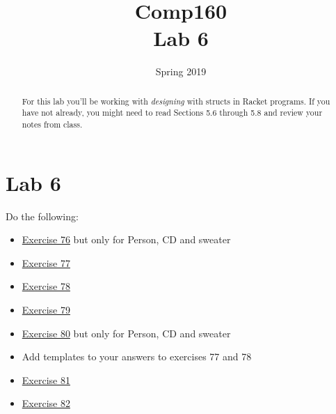 \documentclass[nobib]{tufte-handout}
\title{Comp160 \\ Lab 6 }
\author{}
\date{ Spring 2019 }
\begin{document}
\maketitle

\begin{abstract}
For this lab you'll be working with \textit{designing} with structs in Racket programs.  If you have not already, you might need to read Sections 5.6 through 5.8 and review your notes from class.
\end{abstract}

\section*{Lab 6}

Do the following:

\begin{itemize}
  \item \href{https://htdp.org/2018-01-06/Book/part_one.html#%28counter._data-uni._%28exercise._struct7%29%29}{Exercise 76} but only for Person, CD and sweater
  \item \href{https://htdp.org/2018-01-06/Book/part_one.html#%28counter._data-uni._%28exercise._ex~3atime-structure%29%29}{Exercise 77}
  \item \href{https://htdp.org/2018-01-06/Book/part_one.html#%28counter._data-uni._%28exercise._struct9%29%29}{Exercise 78}
  \item \href{https://htdp.org/2018-01-06/Book/part_one.html#%28counter._data-uni._%28exercise._struct10%29%29}{Exercise 79}
  \item \href{https://htdp.org/2018-01-06/Book/part_one.html#%28counter._%28exercise._struct11%29%29}{Exercise 80} but only for Person, CD and sweater
  \item Add templates to your answers to exercises 77 and 78
  \item \href{https://htdp.org/2018-01-06/Book/part_one.html#%28counter._%28exercise._struct11a%29%29}{Exercise 81}
  \item \href{https://htdp.org/2018-01-06/Book/part_one.html#%28counter._%28exercise._struct11b%29%29}{Exercise 82}
\end{itemize}
\end{document}
